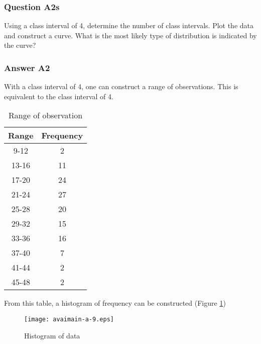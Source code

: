 \subsubsection{Question A2s}
Using a class interval of 4, determine the number of class intervals.
Plot the data and construct a curve. What is the most likely type of distribution
is indicated by the curve?
\subsubsection{Answer A2}
With a class interval of 4, one can construct a range of observations.
This is equivalent to the class interval of 4.

\begin{table}[h]
\caption{Range of observation}
\begin{tabular}{|l|l|}
\hline
\multicolumn{1}{|c|}{Range} & \multicolumn{1}{c|}{Frequency} \\ 
\hline
\multicolumn{1}{|c|}{9-12} & \multicolumn{1}{c|}{2} \\ 
\hline
\multicolumn{1}{|c|}{13-16} & \multicolumn{1}{c|}{11} \\ 
\hline
\multicolumn{1}{|c|}{17-20} & \multicolumn{1}{c|}{24} \\ 
\hline
\multicolumn{1}{|c|}{21-24} & \multicolumn{1}{c|}{27} \\ 
\hline
\multicolumn{1}{|c|}{25-28} & \multicolumn{1}{c|}{20} \\ 
\hline
\multicolumn{1}{|c|}{29-32} & \multicolumn{1}{c|}{15} \\ 
\hline
\multicolumn{1}{|c|}{33-36} & \multicolumn{1}{c|}{16} \\ 
\hline
\multicolumn{1}{|c|}{37-40} & \multicolumn{1}{c|}{7} \\ 
\hline
\multicolumn{1}{|c|}{41-44} & \multicolumn{1}{c|}{2} \\ 
\hline
\multicolumn{1}{|c|}{45-48} & \multicolumn{1}{c|}{2} \\ 
\hline
\end{tabular}
\label{tblavaimain:9}
\end{table}

From this table, a histogram of frequency can be constructed (Figure
\ref{figavaimain-a:1})

\begin{figure}[h]
\texttt{[image: avaimain-a-9.eps]}
\caption{Histogram of data}\label{figavaimain-a:1}
\end{figure}

